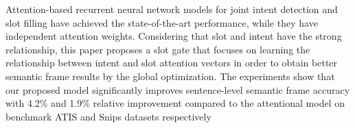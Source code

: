Attention-based recurrent neural network models for joint intent detection and slot filling have achieved the state-of-the-art performance, while they have independent attention weights. Considering that slot and intent have the strong relationship, this paper proposes a slot gate that focuses on learning the relationship between intent and slot attention vectors in order to obtain better semantic frame results by the global optimization. The experiments show that our proposed model significantly improves sentence-level semantic frame accuracy with 4.2\% and 1.9\% relative improvement compared to the attentional model on benchmark ATIS and Snips datasets respectively
